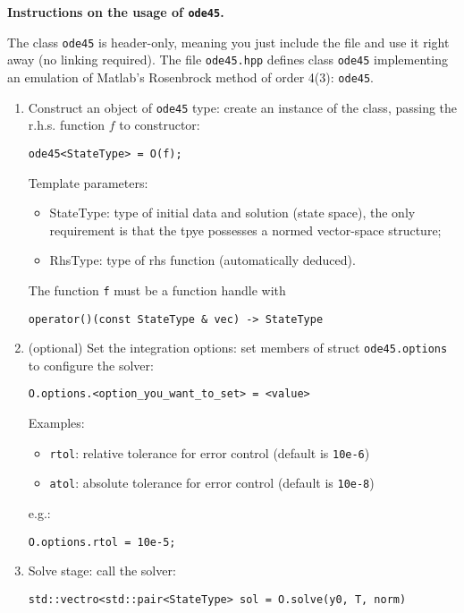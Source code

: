 \textbf{Instructions on the usage of \texttt{ode45}.}

The class \texttt{ode45} is header-only, meaning you just include the file and use it right away (no linking required). 
The file \texttt{ode45.hpp} defines class \texttt{ode45} 
implementing an emulation of Matlab's Rosenbrock method of order 4(3): \texttt{ode45}.

\begin{enumerate}
\item Construct an object of \texttt{ode45} type:
    create an instance of the class, passing the r.h.s. function $f$ to constructor:
    \begin{lstlisting}
ode45<StateType> = O(f);
    \end{lstlisting}
    Template parameters:
    \begin{itemize}
        \item StateType:  type of initial data and solution (state space), the only
        requirement is that the tpye possesses a normed vector-space structure;
        \item RhsType:    type of rhs function (automatically deduced).
    \end{itemize}
    The function \texttt{f} must be a function handle with 
    \begin{lstlisting}
operator()(const StateType & vec) -> StateType
    \end{lstlisting}
    
\item (optional) Set the integration options: set members of struct \texttt{ode45.options} to configure the solver:
    \begin{lstlisting}
O.options.<option_you_want_to_set> = <value>
    \end{lstlisting}
    Examples:
    \begin{itemize}
        \item \texttt{rtol}:       relative tolerance for error control (default is \texttt{10e-6})
        \item \texttt{atol}:       absolute tolerance for error control (default is \texttt{10e-8})
    \end{itemize}
    e.g.:
    \begin{lstlisting}
O.options.rtol = 10e-5;
    \end{lstlisting}

\item Solve stage: call the solver:
    \begin{lstlisting}
std::vectro<std::pair<StateType> sol = O.solve(y0, T, norm)
    \end{lstlisting}


\end{enumerate}
